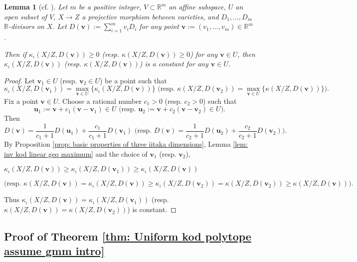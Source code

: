 \documentclass[11pt]{amsart}
\numberwithin{equation}{section}
\newcommand{\Rr}{\mathbb{R}}
\newtheorem{lem}[thm]{Lemma}
\theoremstyle{definition}
\theoremstyle{definition}
\begin{document}
\begin{lem}[{cf. \cite[Proposition 4.1]{Li22}}]\label{lem: kod is cons on open set}
Let $m$ be a positive integer, $V\subset\Rr^m$ an affine subspace, $U$ an open subset of $V$, $X\rightarrow Z$ a projective morphism between varieties, and $D_1,\dots,D_m$ $\Rr$-divisors on $X$. Let $D(\bm{v}):=\sum_{i=1}^mv_iD_i$ for any point $\bm{v}:=(v_1,\dots,v_m)\in\Rr^m$. 

Then if $\kappa_{\iota}(X/Z,D(\bm{v}))\geq 0$ (resp. $\kappa(X/Z,D(\bm{v}))\geq 0$)  for any $\bm{v}\in U$, then $\kappa_{\iota}(X/Z,D(\bm{v}))$ (resp. $\kappa(X/Z,D(\bm{v}))$) is a constant for any $\bm{v}\in U$.
\end{lem}
\begin{proof}
Let $\bm{v}_1\in U$ (resp. $\bm{v}_2\in U$) be a point such that $$\kappa_{\iota}(X/Z,D(\bm{v}_1))=\max_{\bm{v}\in U}\{\kappa_{\iota}(X/Z,D(\bm{v}))\}\text{ (resp. }\kappa(X/Z,D(\bm{v}_2))=\max_{\bm{v}\in U}\{\kappa(X/Z,D(\bm{v}))\}\text{)}.$$
Fix a point $\bm{v}\in U$. Choose a rational number $c_1>0$ (resp. $c_2>0$) such that
$$\bm{u}_1:=\bm{v}+c_1(\bm{v}-\bm{v}_1)\in U\text{ (resp. }\bm{u}_2:=\bm{v}+c_2(\bm{v}-\bm{v}_2)\in U\text{)}.$$
Then 
$$D(\bm{v})=\frac{1}{c_1+1}D(\bm{u}_1)+\frac{c_1}{c_1+1}D(\bm{v}_1)\text{ (resp. }D(\bm{v})=\frac{1}{c_2+1}D(\bm{u}_2)+\frac{c_2}{c_2+1}D(\bm{v}_2)\text{)}.$$
By Proposition \ref{prop: basic properties of three iitaka dimensions}, Lemma \ref{lem: inv kod linear geq maximum} and the choice of $\bm{v}_1$ (resp. $\bm{v}_2$),
\begin{center}
  $\kappa_{\iota}(X/Z,D(\bm{v}))\geq\kappa_{\iota}(X/Z,D(\bm{v}_1))\geq\kappa_{\iota}(X/Z,D(\bm{v}))$
\end{center}
\begin{center}
  $\big(\text{resp. } \kappa(X/Z,D(\bm{v}))=\kappa_{\iota}(X/Z,D(\bm{v}))\geq\kappa_{\iota}(X/Z,D(\bm{v}_2))=\kappa(X/Z,D(\bm{v}_2))\geq\kappa(X/Z,D(\bm{v}))\big).$
\end{center}
Thus $\kappa_{\iota}(X/Z,D(\bm{v}))=\kappa_{\iota}(X/Z,D(\bm{v}_1))$ (resp. $\kappa(X/Z,D(\bm{v}))=\kappa(X/Z,D(\bm{v}_2))$) is constant.
\end{proof}

\subsection{Proof of Theorem \ref{thm: Uniform kod polytope assume gmm intro}}
\end{document}
